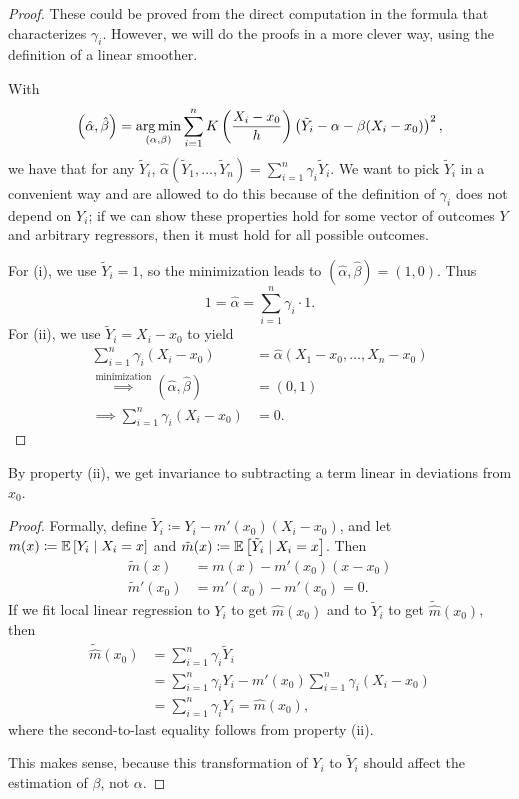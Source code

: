 \begin{proof}
	These could be proved from the direct computation in the formula that characterizes $\gamma_i$. However, we will do the proofs in a more clever way, using the definition of a linear smoother.

	With \[\left( \hat{\alpha}, \hat{\beta} \right) = \operatorname*{arg\,min}_{(\alpha,\beta)} \sum\limits_{i=1}^{n} K\left( \frac{X_i-x_0}{h} \right) \left( \tilde{Y}_i - \alpha - \beta(X_i-x_0) \right)^2,\] 
	we have that for any $\tilde{Y}_i$, $\hat{\alpha}(\tilde{Y}_1,\ldots,\tilde{Y}_n) = \sum_{i=1}^{n} \gamma_i \tilde{Y}_i$.
	We want to pick $\tilde{Y}_i$ in a convenient way and are allowed to do this because of the definition of $\gamma_i$ does not depend on $Y_i$; if we can show these properties hold for some vector of outcomes $Y$ and arbitrary regressors, then it must hold for all possible outcomes.

	For (i), we use $\tilde{Y}_i = 1$, so the minimization leads to $(\hat{\alpha},\hat{\beta}) = (1,0)$. Thus \[
		1= \hat{\alpha} = \sum_{i=1}^{n} \gamma_i \cdot 1 
	.\] 
	For (ii), we use $\tilde{Y}_i = X_i - x_0$ to yield
	\begin{align*}
		\sum_{i=1}^{n} \gamma_i (X_i-x_0) &=  \hat{\alpha}\left( X_1-x_0,\ldots,X_n - x_0 \right) \\
		\overset{\text{minimization}}{\implies} (\hat{\alpha},\hat{\beta}) &= (0,1) \\
		\implies \sum_{i=1}^{n} \gamma_i (X_i - x_0) &= 0
	.\end{align*}

\end{proof}

\begin{corollary}	By property (ii), we get invariance to subtracting a term linear in deviations from $x_0$.
\end{corollary}
\begin{proof}
	Formally, define $\tilde{Y}_i \coloneqq Y_i - m'(x_0)(X_i-x_0)$, and let $m(x) \coloneqq \mathbb{E}\left[Y_i \mid X_i = x\right]$ and $\tilde{m}(x) \coloneqq \mathbb{E}\left[\tilde{Y}_i \mid X_i = x\right]$. Then 
	\begin{align*}
		\tilde{m}(x) &= m(x) - m'(x_0)(x-x_0) \\
		\tilde{m}'(x_0) &= m'(x_0) - m'(x_0) = 0
	.\end{align*} If we fit local linear regression to $Y_i$ to get $\hat{m}(x_0)$ and to $\tilde{Y}_i$ to get $\tilde{\hat{m}}(x_0)$, then 
	\begin{align*}
		\tilde{\hat{m}}(x_0) &= \sum_{i=1}^{n} \gamma_i \tilde{Y}_i \\
							 &= \sum_{i=1}^{n} \gamma_i Y_i - m'(x_0) \sum_{i=1}^{n} \gamma_i (X_i-x_0) \\
							 &= \sum_{i=1}^{n} \gamma_i Y_i = \hat{m}(x_0)
	,\end{align*}
	where the second-to-last equality follows from property (ii).

	This makes sense, because this transformation of $Y_i$ to $\tilde{Y}_i$ should affect the estimation of $\beta$, not $\alpha$.
\end{proof}

